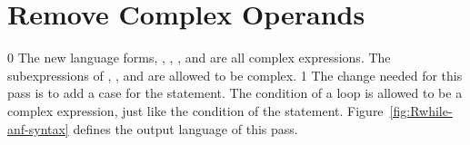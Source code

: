 \documentclass[7x10,nocrop]{TimesAPriori_MIT}%
\def\racketEd{0}
\def\pythonEd{1}
\def\edition{1}
\begin{document}
\section{Remove Complex Operands}
\label{sec:rco-loop}

{\if\edition\racketEd
%
The new language forms, , , , and
 are all complex expressions. The subexpressions of
, , and  are allowed to be complex.
%
\fi}
{\if\edition\pythonEd
%
The change needed for this pass is to add a case for the 
statement. The condition of a  loop is allowed to be a
complex expression, just like the condition of the 
statement.
%
\fi}  
%
Figure~\ref{fig:Rwhile-anf-syntax} defines the output language
\LangLoopANF{} of this pass.


\newcommand{\LwhileMonadASTPython}{
\begin{array}{rcl}
\Stmt{} &::=& \WHILESTMT{\Exp}{\Stmt^{+}} 
\end{array}
}
\end{document}
